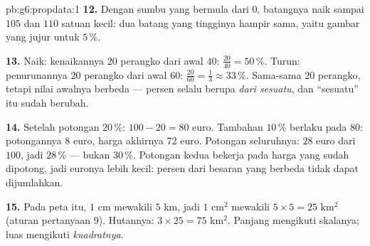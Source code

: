 \begin{solution}{pb:g6:propdata:1}
\textbf{12.} Dengan sumbu yang bermula dari $0$, batangnya naik sampai
$105$ dan $110$ satuan kecil: dua batang yang tingginya hampir sama,
yaitu gambar yang jujur untuk  $5\,\%$.

\textbf{13.} Naik: kenaikannya $20$ perangko dari awal $40$:
$\frac{20}{40} = 50\,\%$. Turun: penurunannya $20$ perangko dari awal
$60$: $\frac{20}{60} = \frac13 \approx 33\,\%$. Sama-sama $20$
perangko, tetapi nilai awalnya berbeda --- persen selalu berupa
 \emph{dari sesuatu}, dan ``sesuatu'' itu sudah berubah.

\textbf{14.} Setelah potongan $20\,\%$: $100 - 20 = 80$ euro.
Tambahan $10\,\%$ berlaku pada $80$: potongannya $8$ euro, harga
akhirnya $72$ euro. Potongan seluruhnya: $28$ euro dari $100$, jadi
$28\,\%$ --- bukan $30\,\%$. Potongan kedua bekerja pada harga yang
sudah dipotong, jadi euronya lebih kecil: persen dari besaran yang
berbeda tidak dapat dijumlahkan.

\textbf{15.} Pada peta itu, $1$ cm mewakili $5$ km, jadi $1$
cm$^2$ mewakili $5 \times 5 = 25$ km$^2$ (aturan pertanyaan 9).
Hutannya: $3 \times 25 = 75$ km$^2$. Panjang mengikuti
skalanya; luas mengikuti \emph{kuadratnya}.

\end{solution}
